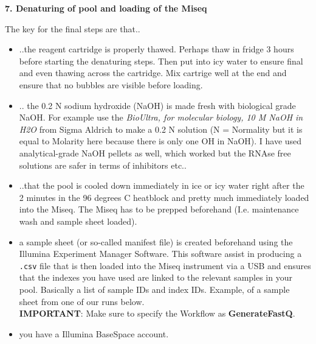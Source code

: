 \documentclass[
]{book}
\providecommand{\tightlist}{%
  \setlength{\itemsep}{0pt}\setlength{\parskip}{0pt}}
\begin{document}
\textbf{7. Denaturing of pool and loading of the Miseq}

The key for the final steps are that..

\begin{itemize}
\tightlist
\item
  ..the reagent cartridge is properly thawed. Perhaps thaw in fridge 3 hours before starting the denaturing steps. Then put into icy water to ensure final and even thawing across the cartridge. Mix cartrige well at the end and ensure that no bubbles are visible before loading.\\
\item
  .. the 0.2 N sodium hydroxide (NaOH) is made fresh with biological grade NaOH. For example use the \emph{BioUltra, for molecular biology, 10 M NaOH in H2O} from Sigma Aldrich to make a 0.2 N solution (N = Normality but it is equal to Molarity here because there is only one OH in NaOH). I have used analytical-grade NaOH pellets as well, which worked but the RNAse free solutions are safer in terms of inhibitors etc..\\
\item
  ..that the pool is cooled down immediately in ice or icy water right after the 2 minutes in the 96 degrees C heatblock and pretty much immediately loaded into the Miseq. The Miseq has to be prepped beforehand (I.e. maintenance wash and sample sheet loaded).\\
\item
  a sample sheet (or so-called manifest file) is created beforehand using the Illumina Experiment Manager Software. This software assist in producing a \texttt{.csv} file that is then loaded into the Miseq instrument via a USB and ensures that the indexes you have used are linked to the relevant samples in your pool. Basically a list of sample IDs and index IDs. Example, of a sample sheet from one of our runs below.\\
  \textbf{IMPORTANT}: Make sure to specify the Workflow as \textbf{GenerateFastQ}.\\
\item
  you have a Illumina BaseSpace account.
\end{itemize}

\hfill\break
\end{document}
